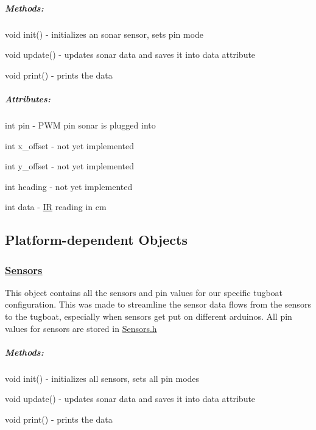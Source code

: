 \subparagraph*{Methods\+:}


\begin{DoxyItemize}
\item {\ttfamily void init()} -\/ initializes an sonar sensor, sets pin mode
\item {\ttfamily void update()} -\/ updates sonar data and saves it into data attribute
\item {\ttfamily void print()} -\/ prints the data
\end{DoxyItemize}

\subparagraph*{Attributes\+:}


\begin{DoxyItemize}
\item {\ttfamily int pin} -\/ P\+WM pin sonar is plugged into
\item {\ttfamily int x\+\_\+offset} -\/ not yet implemented
\item {\ttfamily int y\+\_\+offset} -\/ not yet implemented
\item {\ttfamily int heading} -\/ not yet implemented
\item {\ttfamily int data} -\/ \hyperlink{class_i_r}{IR} reading in cm
\end{DoxyItemize}

\subsection*{Platform-\/dependent Objects}

\subsubsection*{\hyperlink{class_sensors}{Sensors}}

This object contains all the sensors and pin values for our specific tugboat configuration. This was made to streamline the sensor data flows from the sensors to the tugboat, especially when sensors get put on different arduinos. All pin values for sensors are stored in {\ttfamily \hyperlink{_sensors_8h_source}{Sensors.\+h}}

\subparagraph*{Methods\+:}


\begin{DoxyItemize}
\item {\ttfamily void init()} -\/ initializes all sensors, sets all pin modes
\item {\ttfamily void update()} -\/ updates sonar data and saves it into data attribute
\item {\ttfamily void print()} -\/ prints the data
\end{DoxyItemize}

